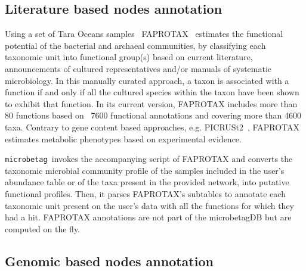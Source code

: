 \documentclass[sn-mathphys,Numbered, lineno]{sn-jnl}  %
\theoremstyle{thmstyleone}%
\theoremstyle{thmstyletwo}%
\theoremstyle{thmstylethree}%
\newcommand{\microbetag}{\texttt{microbetag }}
\begin{document}
    \subsection*{Literature based nodes annotation }
    \label{subsec:fapro}

        Using a set of Tara Oceans samples~\cite{sunagawa2015structure} FAPROTAX~\cite{louca2016decoupling} estimates the functional potential of the bacterial and archaeal communities, by classifying each taxonomic unit into functional group(s) based on current literature, announcements of cultured representatives and/or manuals of systematic microbiology. 
        In this manually curated approach, a taxon is associated with a function if and only if all the cultured species within the taxon have been shown to exhibit that function. 
        In its current version, FAPROTAX includes more than 80 functions based on ~7600 functional annotations and covering more than 4600 taxa.
        Contrary to gene content based approaches, e.g. PICRUSt2~\cite{douglas2020picrust2}, FAPROTAX  estimates metabolic phenotypes based on experimental evidence. 

        \microbetag invokes the accompanying script of FAPROTAX and converts the taxonomic microbial community profile of the samples included in the user's abundance table or of the taxa present in the provided network, into putative functional profiles.
        Then, it parses FAPROTAX's subtables to annotate each taxonomic unit present on the user's data with all the functions for which they had a hit. 
        FAPROTAX annotations are not part of the microbetagDB but are computed on the fly.


    \subsection*{Genomic based nodes annotation }
    \label{subsec:phen}
\end{document}
